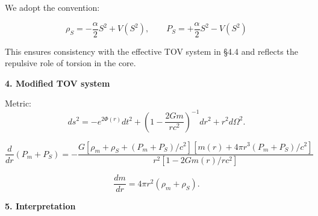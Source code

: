 \documentclass{article}
\begin{document}
We adopt the convention:

\begin{equation}
\rho_S = -\frac{\alpha}{2} S^2 + V(S^2), \qquad P_S = +\frac{\alpha}{2} S^2 - V(S^2)
\end{equation}

This ensures consistency with the effective TOV system in §4.4 and reflects the repulsive role of torsion in the core.



\textbf{4. Modified TOV system}

Metric:
\begin{equation}\label{eq:auto184}
ds^2 = -e^{2\Phi(r)} dt^2 + \left(1 - \frac{2Gm}{rc^2}\right)^{-1} dr^2 + r^2 d\Omega^2.
\end{equation}

\begin{equation}\label{eq:auto185}
\boxed{
\frac{d}{dr}(P_m + P_S) =
-\frac{G \left[\rho_m + \rho_S + (P_m + P_S)/c^2 \right]
 \left[m(r) + 4\pi r^3 (P_m + P_S)/c^2 \right]}
 {r^2 \left[1 - 2Gm(r)/rc^2\right]}
}
\end{equation}

\begin{equation}\label{eq:auto186}
\frac{dm}{dr} = 4\pi r^2 (\rho_m + \rho_S).
\end{equation}

\textbf{5. Interpretation}
\end{document}
